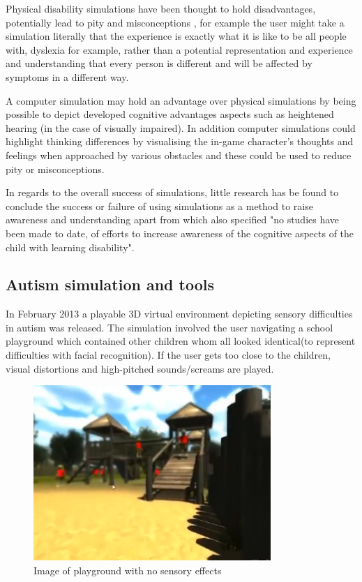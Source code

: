 Physical disability simulations have been thought to hold disadvantages, potentially lead to pity and misconceptions \cite{dd}, for example the user might take a simulation literally that the experience is exactly what it is like to be all people with, dyslexia for example, rather than a potential representation and experience and understanding that every person is different and will be affected by symptoms in a different way.

A computer simulation may hold an advantage over physical simulations by being possible to depict developed cognitive advantages aspects such as heightened hearing (in the case of visually impaired). In addition computer simulations could highlight thinking differences by visualising the in-game character's thoughts and feelings when approached by various obstacles and these could be used to reduce pity or misconceptions.

In regards to the overall success of simulations, little research has be found to conclude the success or failure of using simulations as a method to raise awareness and understanding apart from \cite{dyslexicsimpar} which also specified "no studies have been made to date, of efforts to increase awareness of the cognitive aspects of the child with learning disability".

\subsection{Autism simulation and tools}

In February 2013 a playable 3D virtual environment depicting sensory difficulties in autism was released. The simulation involved the user navigating a school playground which contained other children whom all looked identical(to represent difficulties with facial recognition). If the user gets too close to the children, visual distortions and high-pitched sounds/screams are played. 

\begin{figure}[H]
\centering
\includegraphics[width=90mm]{images/litreview/autisim1.png}
\caption{Image of playground with no sensory effects}
\label{autisim1}
\end{figure}

